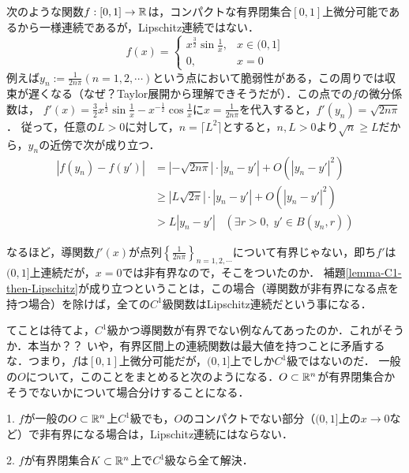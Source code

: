 \documentclass[uplatex,dvipdfmx]{jsreport}
\begin{document}
\begin{example}[一様連続だがLipschitz連続でない例]\label{example-uniform-but-not-Lipschitz}
    次のような関数$f:[0,1]\to\mathbb{R}$は，コンパクトな有界閉集合$[0,1]$上微分可能であるから一様連続であるが，Lipschitz連続ではない．
    \[f(x)=\begin{cases}
        x^\frac{3}{2}\sin\frac{1}{x}, &x\in (0,1]\\
        0,&x=0
    \end{cases}\]
    例えば$y_n:=\frac{1}{2n\pi}(n=1,2,\cdots)$という点において脆弱性がある，この周りでは収束が遅くなる（なぜ？Taylor展開から理解できそうだが）．この点での$f$の微分係数は，
    $f'(x)=\frac{3}{2}x^{\frac{1}{2}}\sin\frac{1}{x}-x^{-\frac{1}{2}}\cos\frac{1}{x}$に$x=\frac{1}{2n\pi}$を代入すると，$f'(y_n)=\sqrt{2n\pi}$．
    従って，任意の$L>0$に対して，$n=\lceil L^2\rceil$とすると，$n,L>0$より$\sqrt{n}\ge L$だから，$y_n$の近傍で次が成り立つ．
    \begin{align*}
        |f(y_n)-f(y')| &= |-\sqrt{2n\pi}|\cdot |y_n-y'|+O(|y_n-y'|^2) \\
        &\ge |L\sqrt{2\pi}|\cdot |y_n-y'|+O(|y_n-y'|^2)\\
        &> L|y_n-y'|\;\;\;(\exists r>0,\; y'\in B(y_n,r))
    \end{align*}
    
    なるほど，導関数$f'(x)$が点列$\left\{\frac{1}{2n\pi}\right\}_{n=1,2,\cdots}$について有界じゃない，即ち$f'$は$(0,1]$上連続だが，$x=0$では非有界なので，そこをついたのか．
    補題\ref{lemma-C1-then-Lipschitz}が成り立つということは，この場合（導関数が非有界になる点を持つ場合）を除けば，全ての$C^1$級関数はLipschitz連続だという事になる．

    てことは待てよ，$C^1$級かつ導関数が有界でない例なんてあったのか．これがそうか．本当か？？
    いや，有界区間上の連続関数は最大値を持つことに矛盾するな．つまり，$f$は$[0,1]$上微分可能だが，$(0,1]$上でしか$C^1$級ではないのだ．
    一般の$O$について，このことをまとめると次のようになる．$O\subset\mathbb{R}^n$が有界閉集合かそうでないかについて場合分けすることになる．

    1. $f$が一般の$O\subset\mathbb{R}^n$上$C^1$級でも，$O$のコンパクトでない部分（$(0,1]$上の$x\to 0$など）で非有界になる場合は，Lipschitz連続にはならない．

    2. $f$が有界閉集合$K\subset\mathbb{R}^n$上で$C^1$級なら全て解決．
\end{example}
\end{document}
